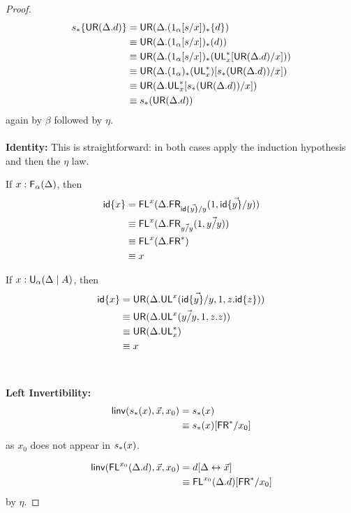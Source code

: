 \begin{proof}
\begin{align*}
s_*\{\mathsf{UR}(\Delta.d)\} 
&= \mathsf{UR}(\Delta.(1_\alpha[s/x])_*\{d\}) \\
&\equiv \mathsf{UR}(\Delta.(1_\alpha[s/x])_*(d)) \\
&\equiv \mathsf{UR}(\Delta.(1_\alpha[s/x])_*(\mathsf{UL}^*_{x}[\mathsf{UR}(\Delta.d)/x])) \\
&\equiv \mathsf{UR}(\Delta. (1_\alpha)_*(\mathsf{UL}^*_{x})[s_*(\mathsf{UR}(\Delta.d))/x]) \\
&\equiv \mathsf{UR}(\Delta. \mathsf{UL}^*_{x}[s_*(\mathsf{UR}(\Delta.d))/x]) \\
&\equiv s_*(\mathsf{UR}(\Delta.d))
\end{align*}
again by $\beta$ followed by $\eta$.
\\~\\
\textbf{Identity:} This is straightforward: in both cases apply the induction hypothesis and then the $\eta$ law.
 
If $x : \mathsf{F}_{\alpha}(\Delta)$, then
\begin{align*}
{\ensuremath{\mathsf{id}}\{x\}} 
&=\mathsf{FL}^{x}(\Delta.\mathsf{FR}_{\vec{{\mathsf{id}\{y\}}/y}}(1,\vec{{\mathsf{id}\{y\}}/y}))\\
&\equiv \mathsf{FL}^{x}(\Delta.\mathsf{FR}_{\vec{y/y}}(1,\vec{y/y}))\\
&\equiv \mathsf{FL}^{x}(\Delta.\mathsf{FR}^*)\\
&\equiv x
\end{align*}

If $x : \mathsf{U}_{\alpha}(\Delta \mid A)$, then
\begin{align*}
{\ensuremath{\mathsf{id}}\{x\}} 
&= \mathsf{UR}(\Delta.\mathsf{UL}^{x}_{}(\vec{{\mathsf{id}\{y\}}/y},1,z.{\mathsf{id}\{z\}}))\\
&\equiv \mathsf{UR}(\Delta.\mathsf{UL}^{x}_{}(\vec{y/y},1,z.z))\\
&\equiv \mathsf{UR}(\Delta.\mathsf{UL}^*_{x})\\
&\equiv x
\end{align*}
\\~\\
\textbf{Left Invertibility:}
\begin{align*}
\mathsf{linv}(s_*(x),\vec{x},x_0) 
&= {s_*(x)} \\
&\equiv s_*(x)[\mathsf{FR}^*/x_0]
\end{align*}
as $x_0$ does not appear in $s_*(x)$.

\begin{align*}
\mathsf{linv}(\mathsf{FL}^{x_0}(\Delta.d),\vec{x},x_0) 
&= d[\Delta \leftrightarrow \vec{x}]\\
&\equiv \mathsf{FL}^{x_0}(\Delta.d)[\mathsf{FR}^*/x_0]
\end{align*}
by $\eta$.


\end{proof}
